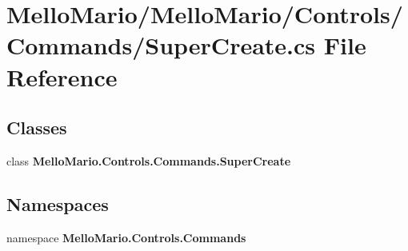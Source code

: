 \section{Mello\+Mario/\+Mello\+Mario/\+Controls/\+Commands/\+Super\+Create.cs File Reference}
\label{SuperCreate_8cs}
\subsection*{Classes}
\begin{DoxyCompactItemize}
\item 
class \textbf{ Mello\+Mario.\+Controls.\+Commands.\+Super\+Create}
\end{DoxyCompactItemize}
\subsection*{Namespaces}
\begin{DoxyCompactItemize}
\item 
namespace \textbf{ Mello\+Mario.\+Controls.\+Commands}
\end{DoxyCompactItemize}
